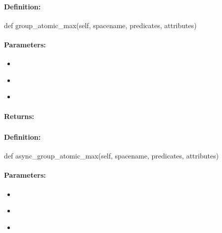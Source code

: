 \paragraph{Definition:}
\begin{pythoncode}
def group_atomic_max(self, spacename, predicates, attributes)
\end{pythoncode}

\paragraph{Parameters:}
\begin{itemize}[noitemsep]
\item {}\\

\item {}\\

\item {}\\

\end{itemize}

\paragraph{Returns:}


\pagebreak
\subsubsection{}
\label{api:python:async_group_atomic_max}


\paragraph{Definition:}
\begin{pythoncode}
def async_group_atomic_max(self, spacename, predicates, attributes)
\end{pythoncode}

\paragraph{Parameters:}
\begin{itemize}[noitemsep]
\item {}\\

\item {}\\

\item {}\\

\end{itemize}

